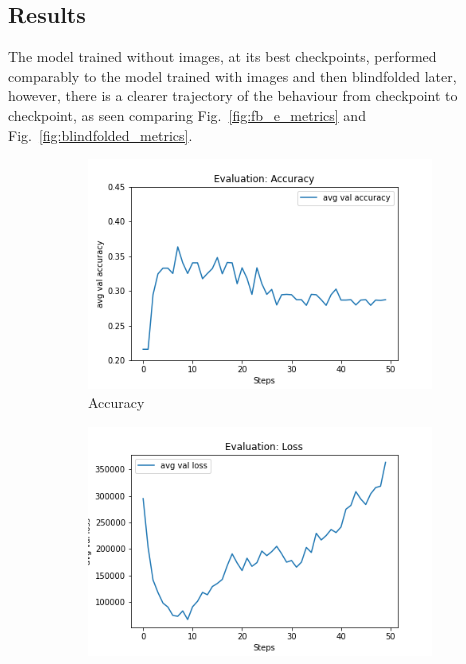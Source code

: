 \subsection{Results}
The model trained without images, at its best checkpoints, performed comparably to the model trained with images and then blindfolded later, however, there is a clearer trajectory of the behaviour from checkpoint to checkpoint, as seen comparing Fig.~\ref{fig:fb_e_metrics} and Fig.~\ref{fig:blindfolded_metrics}.

\begin{figure}[h]
     \centering
     \begin{subfigure}[b]{0.3\textwidth}
         \centering
         \includegraphics[width=\textwidth]{./figure/results/fully_blinded/eval/avg val accuracy.png}
         \caption{Accuracy}
         \label{fig:fb_e_accuracy}
     \end{subfigure}
     \hfill
     \begin{subfigure}[b]{0.3\textwidth}
         \centering
         \includegraphics[width=\textwidth]{./figure/results/fully_blinded/eval/avg val loss.png}

\end{subfigure}
\end{figure}
